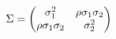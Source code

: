 \documentclass[preview]{standalone}
\begin{document}
\begin{align*}
\special{dvisvgm:raw <g id='unique000'>}\Sigma=\begin{pmatrix}\sigma_1^2&\rho\sigma_1\sigma_2\\\rho\sigma_1\sigma_2&\sigma_2^2\end{pmatrix}\special{dvisvgm:raw </g>}
\end{align*}
\end{document}
